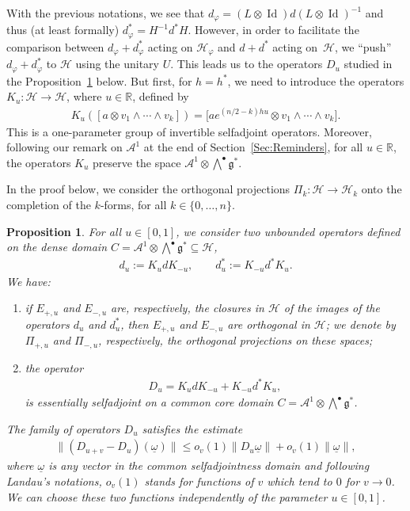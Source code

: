\documentclass[11pt]{article}
\newtheorem{Proposition}[Theorem]{Proposition}
 { \theoremstyle{definition}
\newtheorem{Definition}[Theorem]{Definition}
\newtheorem{Note}[Theorem]{Note}
\newtheorem{Example}[Theorem]{Example}
\newtheorem{Remark}[Theorem]{Remark} }
\newcommand{\Aa}{\mathcal{A}}
\newcommand{\Core}{C}
\newcommand{\Hh}{\mathscr{H}}
\newcommand{\LieG}{\mathfrak{g}}
\newcommand{\omegat}{\underline{\omega}}
\newcommand{\R}{\mathbb{R}}
\DeclareMathOperator{\id}{Id}
\numberwithin{equation}{section}
\begin{document}
With the previous notations, we see that $d_\varphi = (L \otimes \id) d (L \otimes \id)^{-1}$ and thus (at least formally) $d_\varphi^* = H^{-1} d^* H$. However, in order to facilitate the comparison between $d_\varphi + d^*_\varphi$ acting on $\Hh_\varphi$ and $d + d^*$ acting on~$\Hh$, we ``push'' $d_\varphi + d_\varphi^*$ to $\Hh$ using the unitary $U$. This leads us to the operators $D_u$ studied in the Proposition~\ref{Prop:Du} below. But f\/irst, for $h = h^*$, we need to introduce the operators $K_{u} \colon \Hh \to \Hh$, where $u \in \R$, def\/ined by
\begin{gather}
\label{Eqn:DefKu}
K_{u}( [a \otimes v_1 \wedge \cdots \wedge v_k ]) = \big[a e^{(n/2 - k)h u} \otimes v_1 \wedge \cdots \wedge v_k\big].
\end{gather}
This is a one-parameter group of invertible selfadjoint operators. Moreover, following our remark on $\Aa^1$ at the end of Section~\ref{Sec:Reminders}, for all $u \in \R$, the operators $K_u$ preserve the space $\Aa^1 \otimes \bigwedge^\bullet \LieG^*$.

In the proof below, we consider the orthogonal projections $\Pi_k \colon \Hh \to \Hh_k$ onto the completion of the $k$-forms, for all $k \in \{0, \ldots, n \}$.
\begin{Proposition}
\label{Prop:Du}
For all $u \in [0,1]$, we consider two unbounded operators defined on the dense domain $\Core = \Aa^1 \otimes \bigwedge^\bullet \LieG^* \subseteq \Hh$,
\begin{gather*}
d_u := K_{u} d K_{-u},
\qquad
d_u^* := K_{-u} d^* K_{u}.
\end{gather*}
We have:
\begin{enumerate}\itemsep=0pt
\item[$(1)$] %
if $E_{+,u}$ and $E_{-, u}$ are, respectively, the closures in $\Hh$ of the images of the operators $d_u$ and $d_u^*$, then $E_{+,u}$ and $E_{-, u}$ are orthogonal in $\Hh$; we denote by $\Pi_{+,u}$ and $\Pi_{-,u}$, respectively, the orthogonal projections on these spaces;
\item[$(2)$] %
the operator
\begin{gather*}
D_{u} = K_{u} d K_{-u} + K_{-u} d^* K_{u},
\end{gather*}
is essentially selfadjoint on a common core domain $\Core = \Aa^1 \otimes \bigwedge^\bullet \LieG^*$.
\end{enumerate}
The family of operators $D_u$ satisfies the estimate
\begin{gather}
\label{Eqn:EstimateDu}
\| (D_{u+v} - D_u)(\omegat) \| \leqslant o_v(1) \| D_u \omegat \| + o_v(1) \| \omegat \|,
\end{gather}
where $\omegat$ is any vector in the common selfadjointness domain and following Landau's notations, $o_v(1)$ stands for functions of $v$ which tend to $0$ for $v \to 0$. We can choose these two functions independently of the parameter $u \in [0,1]$.
\end{Proposition}
\end{document}

